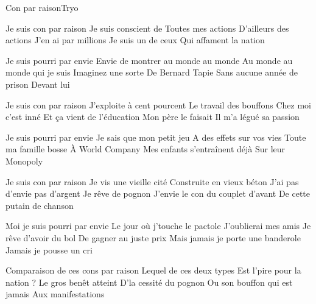 \documentclass[a4paper,11pt,french]{article}
\begin{document}

\begin{Song}{Con par raison}{Tryo}
\begin{multicols}{2}
\begin{Verse}
Je suis con par raison
Je suis conscient de 
Toutes mes actions
D'ailleurs des actions
J'en ai par millions
Je suis un de ceux 
Qui affament la nation
\end{Verse}
\espaceInterStrophe

\begin{Chorus}
Je suis pourri par envie
Envie de montrer au monde au monde 
Au monde au monde qui je suis
Imaginez une sorte 
De Bernard Tapie
Sans aucune année de prison 
Devant lui
\end{Chorus}
\espaceInterStrophe

\begin{Verse}
Je suis con par raison
J'exploite à cent pourcent 
Le travail des bouffons
Chez moi c'est inné 
Et ça vient de l'éducation
Mon père le faisait 
Il m'a légué sa passion
\end{Verse}
\espaceInterStrophe

\begin{Chorus}
Je suis pourri par envie
Je sais que mon petit jeu 
A des effets sur vos vies
Toute ma famille bosse 
\`A World Company
Mes enfants s'entraînent déjà 
Sur leur Monopoly
\end{Chorus}
\vfill
\columnbreak

\begin{Verse}
Je suis con par raison
Je vis une vieille cité 
Construite en vieux béton
J'ai pas d'envie pas d'argent
Je rêve de pognon
J'envie le con du couplet d'avant 
De cette putain de chanson
\end{Verse}
\espaceInterStrophe

\begin{Chorus}
Moi je suis pourri par envie
Le jour où j'touche le pactole 
J'oublierai mes amis
Je rêve d'avoir du bol
De gagner au juste prix
Mais jamais je porte une banderole 
Jamais je pousse un cri
\end{Chorus}
\espaceInterStrophe

\begin{Bridge}
Comparaison de ces cons par raison
Lequel de ces deux types 
Est l'pire pour la nation ?
Le gros benêt atteint 
D'la cessité du pognon
Ou son bouffon qui est jamais
Aux manifestations
\end{Bridge}
\espaceInterStrophe


\end{multicols}
\end{Song}
\end{document}
